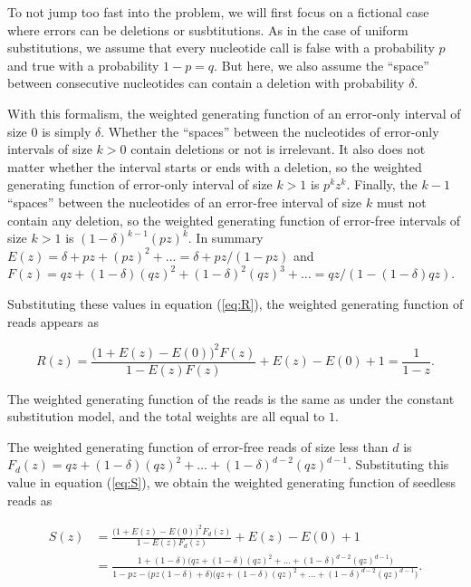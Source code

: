\documentclass{article}
\begin{document}
To not jump too fast into the problem, we will first focus on a fictional
case where errors can be deletions or susbtitutions. As in the case of
uniform substitutions, we assume that every nucleotide call is false with
a probability $p$ and true with a probability $1-p=q$. But here, we also
assume the ``space''  between consecutive nucleotides can contain a
deletion with probability $\delta$.

With this formalism, the weighted generating function of an error-only
interval of size $0$ is simply $\delta$. Whether the ``spaces'' between
the nucleotides of error-only intervals of size $k > 0$ contain deletions
or not is irrelevant. It also does not matter whether the interval starts
or ends with a deletion, so the weighted generating function of error-only
interval of size $k>1$ is $p^kz^k$. Finally, the $k-1$ ``spaces'' between
the nucleotides of an error-free interval of size $k$ must not contain any
deletion, so the weighted generating function of error-free intervals of
size $k>1$ is $(1-\delta)^{k-1}(pz)^k$. In summary $E(z) = \delta + pz +
(pz)^2 + \ldots = \delta + pz / (1-pz)$ and $F(z) = qz + (1-\delta)(qz)^2
+ (1-\delta)^2(qz)^3 + \ldots = qz / (1-(1-\delta)qz)$.

Substituting these values in equation (\ref{eq:R}), the weighted
generating function of reads appears as

\begin{equation*}
R(z) = \frac{\big(1+E(z)-E(0)\big)^2F(z)}{1-E(z)F(z)} + E(z)-E(0)+1 =
\frac{1}{1-z}.
\end{equation*}

The weighted generating function of the reads is the same as under the
constant substitution model, and the total weights are all equal to $1$.

The weighted generating function of error-free reads of size less than $d$
is $F_d(z) = qz + (1-\delta)(qz)^2 + \ldots + (1-\delta)^{d-2}(qz)^{d-1}$.
Substituting this value in equation (\ref{eq:S}), we obtain the
weighted generating function of seedless reads as

\begin{equation*}
\begin{split}
S(z) &= \frac{\big(1+E(z)-E(0)\big)^2F_d(z)}{1-E(z)F_d(z)} +
  E(z)-E(0)+1 \\
&= \frac{1+(1-\delta)\big(qz+(1-\delta)(qz)^2 + \ldots +
  (1-\delta)^{d-2}(qz)^{d-1}\big)}
  {1-pz - \big(pz(1-\delta) + \delta\big)\big(qz+(1-\delta)(qz)^2 +
  \ldots + (1-\delta)^{d-2}(qz)^{d-1}\big)}.
\end{split}
\end{equation*}
\end{document}
